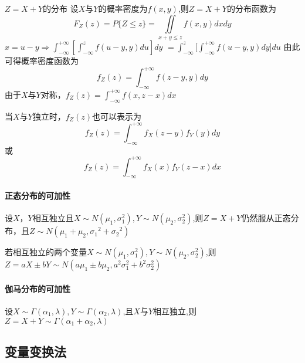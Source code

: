     \begin{theorem}
        $Z = X+Y$的分布
        设$X$与$Y$的概率密度为$f(x,y)$,则$Z=X+Y$的分布函数为
        $${F_Z}(z) = P\{ Z \leqslant z\}= \iint\limits_{x + y \leqslant z} {f(x,y)}dxdy $$
        $x=u-y \Rightarrow \int_{ - \infty }^{ + \infty } {[\int_{ - \infty }^z {f(u - y,y)du} ]} dy$
        $ = \int_{ - \infty }^z {[\int_{ - \infty }^{ + \infty } {f(u - y,y)dy} } ]du$
        由此可得概率密度函数为
        $${f_Z}(z) = \int_{ - \infty }^{ + \infty } {f(z - y,y)dy} $$
        由于$X$与$Y$对称，${f_Z}(z) = \int_{ - \infty }^{ + \infty } {f(x,z - x)} dx$

        当$X$与$Y$独立时，$f_Z(z)$也可以表示为$${f_Z}(z) = \int_{ - \infty }^{ + \infty } {{f_X}(z - y){f_Y}(y)dy} $$
        或$${f_Z}(z) = \int_{ - \infty }^{ + \infty } {{f_X}(x){f_Y}(z - x)} dx$$

    \end{theorem}

    \paragraph{正态分布的可加性}
    设$X$，$Y$相互独立且$X \sim N({\mu _1},\sigma _1^2),Y \sim N({\mu _2},\sigma _2^2) $,则$Z=X+Y$仍然服从正态分布，且$Z \sim N({\mu _1} + {\mu _2},{\sigma _1}^2 + {\sigma _2}^2)$

    若相互独立的两个变量$X \sim N({\mu _1},\sigma _1^2),Y \sim N({\mu _2},\sigma _2^2)$,则$Z = aX \pm bY \sim N(a{\mu _1} \pm b{\mu _2},{a^2}\sigma _1^2 + {b^2}\sigma _2^2)$


    \paragraph{伽马分布的可加性}
    设$X \sim \Gamma (\alpha_1,{\lambda}),Y \sim \Gamma (\alpha_2,{\lambda})$,且$X$与$Y$相互独立,则$Z=X + Y \sim \Gamma (\alpha_1 + \alpha_2,\lambda)$

    \subsection{变量变换法}

